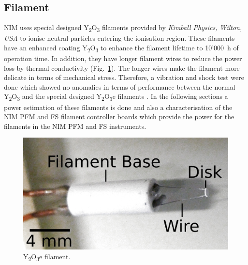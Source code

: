 	\subsection{Filament }
		NIM uses special designed Y\textsubscript{2}O\textsubscript{3} filaments provided by \textit{Kimball Physics, Wilton, USA} to ionise neutral particles entering the ionisation region. These filaments have an enhanced coating Y\textsubscript{2}O\textsubscript{3} to enhance the filament lifetime to 10'000~h of operation time. In addition, they have longer filament wires to reduce the power loss by thermal conductivity (Fig.~\ref{fig:Y2O3Fil}). The longer wires make the filament more delicate in terms of mechanical stress. Therefore, a vibration and shock test were done which showed no anomalies in terms of performance between the normal Y\textsubscript{2}O\textsubscript{3} and the special designed Y\textsubscript{2}O\textsubscript{3}e filaments \cite{Diss_Fausch}. In the following sections a power estimation of these filaments is done and also a characterisation of the NIM PFM and FS filament controller boards which provide the power for the filaments in the NIM PFM and FS instruments.
		\begin{figure}[h]
			\centering
			\includegraphics[width=.5\textwidth]{Bilder/Y2O3_filament.png}
			\caption{Y\textsubscript{2}O\textsubscript{3}e filament.}
			\label{fig:Y2O3Fil}
		\end{figure}
		

